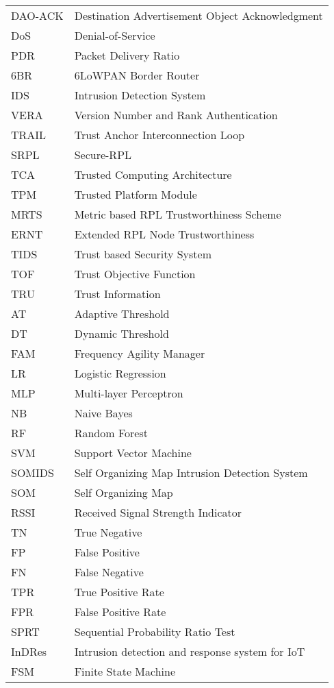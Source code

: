 \documentclass[10pt,journal,sort & compress]{IEEEtran}
\begin{document}
\begin{table}[]
\begin{tabular}{ll}
		DAO-ACK & Destination Advertisement Object Acknowledgment \\
		DoS & Denial-of-Service \\
		PDR & Packet Delivery Ratio \\
		6BR & 6LoWPAN Border Router \\
		IDS & Intrusion Detection System \\
		VERA & Version Number and Rank Authentication \\
		TRAIL & Trust Anchor Interconnection Loop \\
		SRPL & Secure-RPL \\
		TCA & Trusted Computing Architecture \\
		TPM & Trusted Platform Module \\
		MRTS & Metric based RPL Trustworthiness Scheme \\
		ERNT & Extended RPL Node Trustworthiness \\
		TIDS & Trust based Security System \\
		TOF & Trust Objective Function \\
		TRU & Trust Information \\
		AT & Adaptive Threshold \\
		DT & Dynamic Threshold \\
		FAM & Frequency Agility Manager \\
		LR & Logistic Regression \\
		MLP & Multi-layer Perceptron \\
		NB & Naive Bayes \\
		RF & Random Forest \\
		SVM & Support Vector Machine \\
		SOMIDS & Self Organizing Map Intrusion Detection System \\
		SOM & Self Organizing Map \\
		RSSI & Received Signal Strength Indicator \\
		TN & True Negative \\
		FP & False Positive \\
		FN & False Negative \\
		TPR & True Positive Rate \\
		FPR & False Positive Rate \\
		SPRT & Sequential Probability Ratio Test \\
		InDRes & Intrusion detection and response system for IoT \\
		FSM & Finite State Machine \\

\end{tabular}
\end{table}
\end{document}
